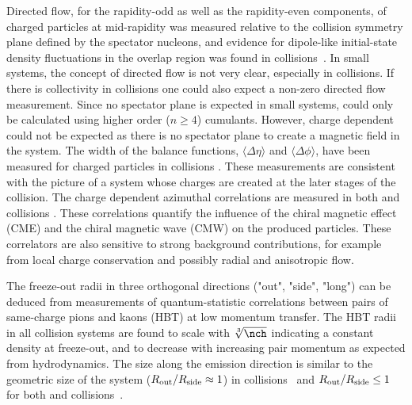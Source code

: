 \documentclass[../report.tex]{subfiles}
\begin{document}
Directed flow, for the rapidity-odd as well as the rapidity-even components, of charged particles at mid-rapidity was measured relative to the collision symmetry plane defined by the spectator nucleons, and evidence for dipole-like initial-state density fluctuations in the overlap region was found in \PbPb collisions~\cite{Abelev:2013cva}. In small systems, the concept of directed flow is not very clear, especially in \pp collisions. If there is collectivity in \pp collisions one could also expect a non-zero directed flow measurement. Since no spectator plane is expected in small systems, \vone could only be calculated using higher order ($n\geq 4$) cumulants. However, charge dependent \vone could not be expected as there is no spectator plane to create a magnetic field in the system. The width of the balance functions, $\langle\Delta\eta\rangle$ and $\langle\Delta\phi\rangle$, have been measured for charged particles in \PbPb collisions \cite{Abelev:2013csa}. These measurements are consistent with the picture of a system whose charges are created at the later stages of the collision. The charge dependent azimuthal correlations are measured in both \PbPb and \pPb collisions \cite{Abelev:2014pja,Adam:2015pya,Aamodt:2011kd,CMS:2014mla,Aaboud:2017xpw}. These correlations quantify the influence of the chiral magnetic effect (CME) and the chiral magnetic wave (CMW) on the produced particles. These correlators are also sensitive to strong background contributions, for example from local charge conservation and possibly radial and anisotropic flow. %

The freeze-out radii in three orthogonal directions ("out", "side", "long") can be deduced from measurements of quantum-statistic correlations between pairs of same-charge pions and kaons (HBT) at low momentum transfer. The HBT radii in all collision systems are found to scale with $\sqrt[3]{\nch}$ indicating a constant density at freeze-out, and to decrease with increasing pair momentum \kT as expected from hydrodynamics. The size along the emission direction is similar to the geometric size of the system ($R_{\rm out}/R_{\rm side} \approx 1$) in \PbPb collisions~\cite{Adam:2015vna,Adam:2015vja,Abelev:2014pja,CMS:2014mla,Acharya:2017qtq,Acharya:2017qtq} and $R_{\rm out}/R_{\rm side} \leq 1$ for both \pPb and \pp collisions~\cite{Abelev:2014pja,Adam:2015pya,Aamodt:2011kd,CMS:2014mla,Aaboud:2017xpw}.
\end{document}
